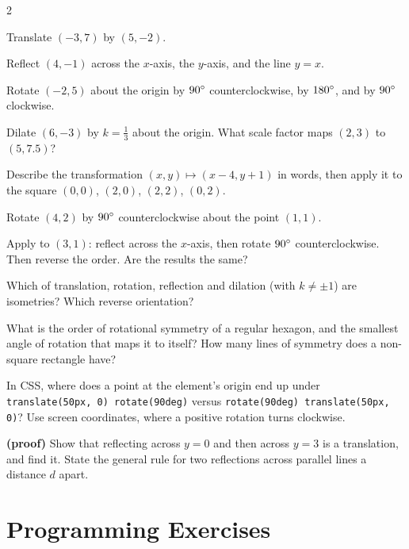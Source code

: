 \begin{multicols}{2}
\begin{exercises}
\item Translate $(-3, 7)$ by $(5, -2)$.
\item Reflect $(4, -1)$ across the $x$-axis, the $y$-axis, and the line $y = x$.
\item Rotate $(-2, 5)$ about the origin by $90^\circ$ counterclockwise, by $180^\circ$, and by $90^\circ$ clockwise.
\item Dilate $(6, -3)$ by $k = \tfrac{1}{3}$ about the origin. What scale factor maps $(2, 3)$ to $(5, 7.5)$?
\item Describe the transformation $(x, y) \mapsto (x - 4, y + 1)$ in words, then apply it to the square $(0, 0)$, $(2, 0)$, $(2, 2)$, $(0, 2)$.
\item Rotate $(4, 2)$ by $90^\circ$ counterclockwise about the point $(1, 1)$.
\item Apply to $(3, 1)$: reflect across the $x$-axis, then rotate $90^\circ$ counterclockwise. Then reverse the order. Are the results the same?
\item Which of translation, rotation, reflection and dilation (with $k \ne \pm 1$) are isometries? Which reverse orientation?
\item What is the order of rotational symmetry of a regular hexagon, and the smallest angle of rotation that maps it to itself? How many lines of symmetry does a non-square rectangle have?
\item In CSS, where does a point at the element's origin end up under \lstinline!translate(50px, 0) rotate(90deg)! versus \lstinline!rotate(90deg) translate(50px, 0)!? Use screen coordinates, where a positive rotation turns clockwise.
\item \textbf{(proof)} Show that reflecting across $y = 0$ and then across $y = 3$ is a translation, and find it. State the general rule for two reflections across parallel lines a distance $d$ apart.
\end{exercises}
\end{multicols}

\section{Programming Exercises}

